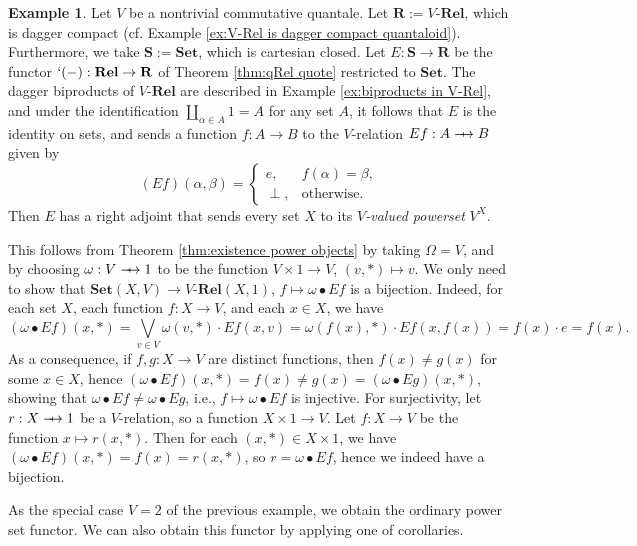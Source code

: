 \documentclass[12pt]{tac}
\theoremstyle{definition}
\newtheorem{example}[theorem]{Example}
\theoremstyle{remark}
\newcommand{\<}{\langle}
\renewcommand{\>}{\rangle}
\renewcommand{\:}{\colon}
\def\sto{\relbar\joinrel\mapstochar\joinrel\rightarrow}
\begin{document}
\begin{example}
    Let $V$ be a nontrivial commutative quantale. Let $\mathbf R:=V$-$\mathbf{Rel}$, which is dagger compact (cf. Example \ref{ex:V-Rel is dagger compact quantaloid}). Furthermore, we take $\mathbf{S}:=\mathbf{Set}$, which is cartesian closed. 
    Let $E:\mathbf{S}\to\mathbf{R}$ be the functor $`(-):\mathbf{Rel}\to\mathbf R$ of Theorem \ref{thm:qRel quote} restricted to $\mathbf{Set}$. The dagger biproducts of $V$-$\mathbf{Rel}$ are described in Example \ref{ex:biproducts in V-Rel}, and under the identification $\coprod_{\alpha\in A}1=A$ for any set $A$, it follows that $E$ is the identity on sets, and sends a function $f:A\to B$ to the $V$-relation $Ef:A\sto B$ given by \[(Ef)(\alpha,\beta)=\begin{cases} e, & f(\alpha)=\beta,\\
    \perp, & \text{otherwise}.
    \end{cases}\]
    Then $E$ has a right adjoint that sends every set $X$ to its $V$\emph{-valued powerset} $V^X$.

    This follows from Theorem \ref{thm:existence power objects} by taking $\Omega=V$, and by choosing $\omega:V\sto 1$ to be the function $V\times 1\to V$, $(v,*)\mapsto v$. 
We only need to show that $\mathbf{Set}(X,V)\to V$-$\mathbf{Rel}(X,1)$, $f\mapsto \omega\bullet Ef$ is a bijection.
Indeed,  for each set $X$, each function $f:X\to V$, and each $x\in X$, we have
    \[ (\omega\bullet Ef)(x,*)=\bigvee_{v\in V}\omega(v,*)\cdot Ef (x,v)=\omega(f(x),*)\cdot Ef (x,f(x))=f(x)\cdot e=f(x).\]
As a consequence, if $f,g:X\to V$ are distinct functions, then $f(x)\neq g(x)$ for some $x\in X$, hence $(\omega\bullet Ef)(x,*)=f(x)\neq g(x)=(\omega\bullet Eg)(x,*)$, showing that $\omega\bullet Ef\neq\omega\bullet Eg$, i.e., $f\mapsto\omega\bullet Ef$ is injective. For surjectivity, let $r:X\sto 1$ be a $V$-relation, so a function $X\times 1\to V$. Let $f:X\to V$ be the function $x\mapsto r(x,*)$. Then for each $(x,*)\in X\times 1$, we have $(\omega\bullet Ef)(x,*)=f(x)=r(x,*)$, so $r=\omega\bullet Ef$, hence we indeed have a bijection.
\end{example}


As the special case $V=2$ of the previous example, we obtain the ordinary power set functor. We can also obtain this functor by applying one of corollaries. 
\end{document}
